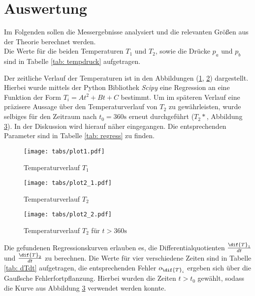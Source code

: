 \section{Auswertung}
Im Folgenden sollen die Messergebnisse analysiert und die relevanten Größen aus der Theorie berechnet werden. \\
Die Werte für die beiden Temperaturen $T_1$ und $T_2$, sowie die Drücke $p_a$ und $p_b$ sind in Tabelle \ref{tab: tempdruck} aufgetragen.
\FloatBarrier

\FloatBarrier
Der zeitliche Verlauf der Temperaturen ist in den Abbildungen (\ref{fig: plot1}, \ref{fig: plot2}) dargestellt. Hierbei wurde mittels der Python Bibliothek \emph{Scipy} \cite{scipy} eine %
Regression an eine Funktion der Form $T_i = A t^2 + B t + C$ bestimmt. Um im späteren Verlauf eine präzisere Aussage über den Temperaturverlauf
von $T_2$ zu gewährleisten, wurde selbiges für den Zeitraum nach $t_0 = 360 \si{\second}$ erneut durchgeführt ($T_2*$, Abbildung \ref{fig: plot2*}). In der Diskussion wird hierauf näher eingegangen. Die entsprechenden
Parameter sind in Tabelle \ref{tab: regress} zu finden. \\


\begin{figure}
  \centering
  \texttt{[image: tabs/plot1.pdf]}
  \caption{Temperaturverlauf $T_1$}
  \label{fig: plot1}
\end{figure}

\begin{figure}
  \centering
  \texttt{[image: tabs/plot2\_1.pdf]}
  \caption{Temperaturverlauf $T_2$}
  \label{fig: plot2}
\end{figure}

\begin{figure}
  \centering
  \texttt{[image: tabs/plot2\_2.pdf]}
  \caption{Temperaturverlauf $T_2$ für $t > 360 \si{\second}$}
  \label{fig: plot2*}
\end{figure}


Die gefundenen Regressionskurven erlauben es, die Differentialquotienten $\frac{\dif{T}_1}{dt}$ und $\frac{\dif{T}_2}{dt}$ zu berechnen. Die Werte für vier verschiedene  Zeiten sind %
in Tabelle \ref{tab: dTdt} aufgetragen, die entsprechenden Fehler $o_{\dif{T}_i}$ ergeben sich über die Gaußsche Fehlerfortpflanzung. Hierbei wurden die Zeiten $t > t_0$ gewählt, sodass die Kurve aus Abbildung \ref{fig: plot2*} verwendet werden konnte. %

